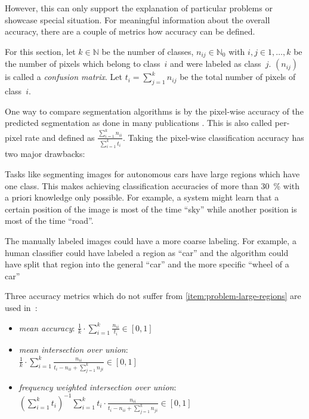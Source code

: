 However, this can only support the explanation of particular problems or
showcase special situation. For meaningful information about the overall
accuracy, there are a couple of metrics how accuracy can be defined.

For this section, let $k \in \mathbb{N}$ be the number of classes, $n_{ij} \in
\mathbb{N}_0$ with $i,j \in 1, \dots, k$ be the number of pixels which belong
to class~$i$ and were labeled as class~$j$. $(n_{ij})$ is called a
\textit{confusion matrix}. Let $t_i = \sum_{j=1}^k n_{ij}$ be the total number
of pixels of class~$i$.

One way to compare segmentation algorithms is by the pixel-wise accuracy of the
predicted segmentation as done in many publications
\cite{shotton2006textonboost,csurka2008simple,long2014fully}. This is also
called per-pixel rate and defined as $\frac{\sum_{i=1}^k n_{ii}}{\sum_{i=1}^k
t_i}$. Taking the pixel-wise classification accuracy has two major drawbacks:

\begin{problemnr}
    \item \label{item:problem-large-regions} Tasks like segmenting images for
          autonomous cars have large regions which have one class. This makes
          achieving classification accuracies of more than \SI{30}{\percent}
          with a priori knowledge only possible. For example, a system might
          learn that a certain position of the image is most of the time
          \enquote{sky} while another position is most of the time
          \enquote{road}.
    \item \label{item:problem-labeling-granularity} The manually labeled images
          could have a more coarse labeling. For example, a human classifier
          could have labeled a region as
          \enquote{car} and the algorithm could have split that region into
          the general \enquote{car} and the more specific \enquote{wheel of a
          car}
\end{problemnr}
\goodbreak
Three accuracy metrics which do not suffer from
\cref{item:problem-large-regions} are used in~\cite{long2014fully}:\nobreak%
\begin{itemize}
    \item \textit{mean accuracy}: $\frac{1}{k} \cdot \sum_{i=1}^k \frac{n_{ii}}{t_i} \in [0, 1]$
    \item \textit{mean intersection over union}: \hfill\\$\frac{1}{k} \cdot \sum_{i=1}^k \frac{n_{ii}}{t_i - n_{ii} + \sum_{j=1}^k n_{ji}} \in [0, 1]$
    \item \textit{frequency weighted intersection over union}:
          ${({\sum_{i=1}^k t_i})}^{-1} \sum_{i=1}^k t_i \cdot \frac{n_{ii}}{t_i - n_{ii} + \sum_{j=1}^k n_{ji}} \in [0, 1]$
\end{itemize}

